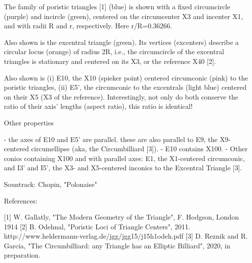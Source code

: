 The family of poristic triangles [1] (blue) is shown with a fixed circumcircle (purple) and incircle (green), centered on the circumcenter X3 and incenter X1, and with radii R and r, respectively. Here r/R=0.36266.

Also shown is the excentral triangle (green). Its vertices (excenters) describe a circular locus (orange) of radius 2R, i.e., the circumcircle of the excentral triangles is stationary and centered on its X3, or the reference X40 [2].

Also shown is (i) E10, the X10 (spieker point) centered circumconic (pink) to the poristic triangles, (ii) E5', the circumconic to the excentrals (light blue) centered on their X5 (X3 of the reference). Interestingly, not only do both conserve the ratio of their axis' lengths (aspect ratio), this ratio is identical!

Other properties

 - the axes of E10 and E5' are parallel. these are also parallel to E9, the X9-centered circumellipse (aka, the Circumbilliard [3]).
- E10 contains X100.
- Other conics containing X100 and with parallel axes: E1, the X1-centered circumconic, and I3' and I5', the X3- and X5-centered inconics to the Excentral Triangle [3].

Sountrack: Chopin, "Polonaise"

References:

[1] W. Gallatly, "The Modern Geometry of the Triangle",  F. Hodgson, London 1914
[2] B. Odehnal, "Poristic Loci of Triangle Centers", 2011. http://www.heldermann-verlag.de/jgg/jgg15/j15h1odeh.pdf
[3] D. Reznik and R. Garcia, "The Circumbilliard: any Triangle has an Elliptic Billiard", 2020, in preparation.